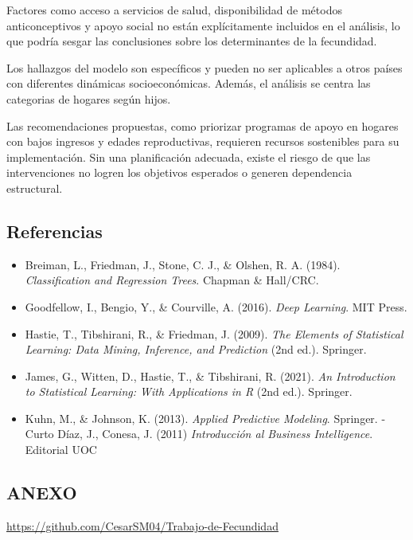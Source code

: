 \documentclass[
]{article}
\providecommand{\tightlist}{%
  \setlength{\itemsep}{0pt}\setlength{\parskip}{0pt}}
\begin{document}
Factores como acceso a servicios de salud, disponibilidad de métodos
anticonceptivos y apoyo social no están explícitamente incluidos en el
análisis, lo que podría sesgar las conclusiones sobre los determinantes
de la fecundidad.

Los hallazgos del modelo son específicos y pueden no ser aplicables a
otros países con diferentes dinámicas socioeconómicas. Además, el
análisis se centra las categorias de hogares según hijos.

Las recomendaciones propuestas, como priorizar programas de apoyo en
hogares con bajos ingresos y edades reproductivas, requieren recursos
sostenibles para su implementación. Sin una planificación adecuada,
existe el riesgo de que las intervenciones no logren los objetivos
esperados o generen dependencia estructural.

\subsection{Referencias}\label{referencias}

\begin{itemize}
\tightlist
\item
  Breiman, L., Friedman, J., Stone, C. J., \& Olshen, R. A. (1984).
  \emph{Classification and Regression Trees}. Chapman \& Hall/CRC.
\item
  Goodfellow, I., Bengio, Y., \& Courville, A. (2016). \emph{Deep
  Learning}. MIT Press.
\item
  Hastie, T., Tibshirani, R., \& Friedman, J. (2009). \emph{The Elements
  of Statistical Learning: Data Mining, Inference, and Prediction} (2nd
  ed.). Springer.
\item
  James, G., Witten, D., Hastie, T., \& Tibshirani, R. (2021). \emph{An
  Introduction to Statistical Learning: With Applications in R} (2nd
  ed.). Springer.
\item
  Kuhn, M., \& Johnson, K. (2013). \emph{Applied Predictive Modeling}.
  Springer. -Curto Díaz, J., Conesa, J. (2011) \emph{Introducción al
  Business Intelligence}. Editorial UOC
\end{itemize}

\subsection{ANEXO}\label{anexo}

\url{https://github.com/CesarSM04/Trabajo-de-Fecundidad}
\end{document}
